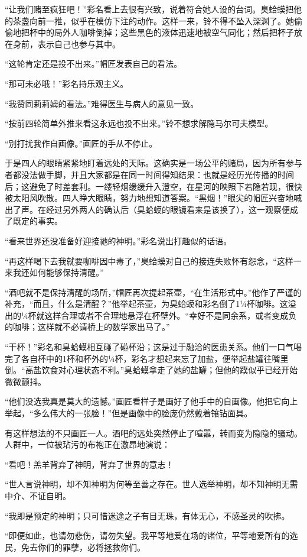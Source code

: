 “让我们赌至疯狂吧！”彩名看上去很有兴致，说着符合她人设的台词。臭蛤蟆把他的茶盏向前一推，似乎在模仿下注的动作。这样一来，铃不得不坠入深渊了。她偷偷地把杯中的局外人咖啡倒掉；这些黑色的液体迅速地被空气同化；然后把杯子放在身前，表示自己也参与其中。

“这轮肯定还是投不出来。”帽匠发表自己的看法。

“那可未必哦！”彩名持乐观主义。

“我赞同莉莉姆的看法。”难得医生与病人的意见一致。

“按前四轮简单外推来看这永远也投不出来。”铃不想求解隐马尔可夫模型。

“别打扰我作自画像。”画匠的手从不停止。

于是四人的眼睛紧紧地盯着远处的天际。这确实是一场公平的赌局，因为所有参与者都没法做手脚，并且大家都是在同一时间得知结果：也就是经历光传播的时间后；这避免了时差套利。一缕轻烟缓缓升入澄空，在星河的映照下若隐若现，很快被太阳风吹散。四人睁大眼睛，努力地想知道答案。“黑烟！”眼尖的帽匠兴奋地喊出了声。在经过另外两人的确认后（臭蛤蟆的眼镜看来是该换了），这一观察便成了既定的事实。

“看来世界还没准备好迎接祂的神明。”彩名说出打趣似的话语。

“再这样喝下去我就要咖啡因中毒了，”臭蛤蟆对自己的接连失败怀有怨念，“这样一来我还如何能够保持清醒。”

“酒吧就不是保持清醒的场所，”帽匠再次提起茶壶，“在生活形式中。”他作了严谨的补充，“而且，什么是清醒？”他举起茶壶，为臭蛤蟆和彩名倒了1¼杯咖啡。这溢出的¼杯就这样合理或者不合理地悬浮在杯壁外。“幸好不是同余系，或者变成负的咖啡；这样就不必请桥上的数学家出马了。”

“干杯！”彩名和臭蛤蟆相互碰了碰杯沿；这是过于融洽的医患关系。他们一口气喝完了各自杯中的1杯和杯外的¼杯，彩名才想起来忘了加盐，便举起盐罐往嘴里倒。“高盐饮食对心理状态不利。”臭蛤蟆拿走了她的盐罐；但他的蹼似乎已经开始微微颤抖。

“他们没选我真是莫大的遗憾。”画匠看样子是画好了他手中的自画像。他把它向上举起，“多么伟大的一张脸！”但是画像中的脸庞仍然戴着镶钻面具。

有这样想法的不只画匠一人。酒吧的远处突然停止了喧嚣，转而变为隐隐的骚动。人群中，一位被玷污的布袍正在激昂地演说：

“看吧！羔羊背弃了神明，背弃了世界的意志！

“世人言说神明，却不知神明为何等至善之存在。世人选举神明，却不知神明无需中介、不证自明。

“我即是预定的神明；只可惜迷途之子有目无珠，有体无心，不感圣灵的吹拂。

“即便如此，也请勿悲伤，请勿失望。我平等地爱在场的诸位，平等地爱所有的选民，免去你们的罪孽，必将拯救你们。

